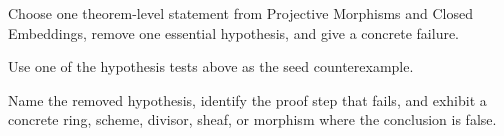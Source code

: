 \begin{exercise}\label{exr:vi38-expand-16}
Choose one theorem-level statement from Projective Morphisms and Closed Embeddings, remove one essential hypothesis, and give a concrete failure.
\end{exercise}
\begin{hint}
Use one of the hypothesis tests above as the seed counterexample.
\end{hint}
\begin{solution}
Name the removed hypothesis, identify the proof step that fails, and exhibit a concrete ring, scheme, divisor, sheaf, or morphism where the conclusion is false.
\end{solution}

